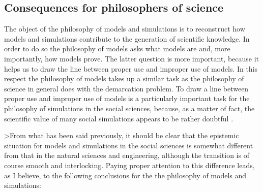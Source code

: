 \documentclass[onecollarge]{STJour}
\numberwithin{equation}{section}
\begin{document}
\subsection{Consequences for philosophers of science}

The object of the philosophy of models and simulations is to reconstruct
how models and simulations contribute to the generation of scientific
knowledge. In order to do so the philosophy of models asks what models
are and, more importantly, how models prove. The latter question is more
important, because it helps us to draw the line between proper use
and improper use of models. In this respect the philosophy of models takes up
a similar task as the philosophy of science in general does with the
demarcation problem. To draw a line between proper use and improper use
of models is a particularly important task for the philosophy of
simulations in the social sciences, because, as a matter of fact, the
scientific value of many social simulations appears to be rather
doubtful \citep{arnold:2008, hammerstein:2003}.

>From what has been said previously, it should be clear that the epistemic
situation for models and simulations in the social sciences is somewhat
different from that in the natural sciences and engineering, although the
transition is of course smooth and interlocking. Paying proper
attention to this difference leads, as I believe, to the following
conclusions for the the philosophy of models and simulations:
\end{document}
